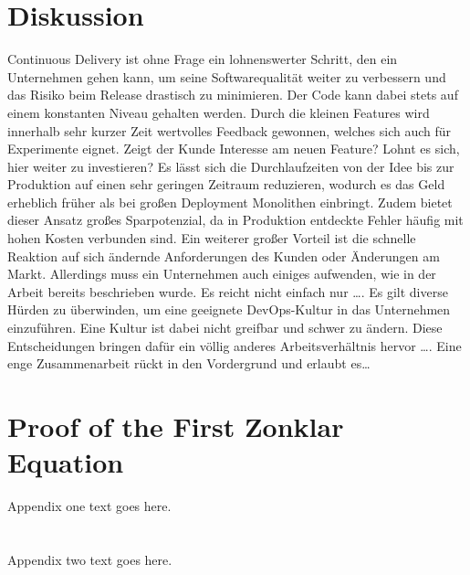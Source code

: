 \section{Diskussion}
Continuous Delivery ist ohne Frage ein lohnenswerter Schritt, den ein Unternehmen gehen kann, um seine Softwarequalität weiter zu verbessern und das Risiko beim Release drastisch zu minimieren. Der Code kann dabei stets auf einem konstanten Niveau gehalten werden. Durch die kleinen Features wird innerhalb sehr kurzer Zeit wertvolles Feedback gewonnen, welches sich auch für Experimente eignet. Zeigt der Kunde Interesse am neuen Feature? Lohnt es sich, hier weiter zu investieren? Es lässt sich die Durchlaufzeiten von der Idee bis zur Produktion auf einen sehr geringen Zeitraum reduzieren, wodurch es das Geld erheblich früher als bei großen Deployment Monolithen einbringt. Zudem bietet dieser Ansatz großes Sparpotenzial, da in Produktion entdeckte Fehler häufig mit hohen Kosten verbunden sind. Ein weiterer großer Vorteil ist die schnelle Reaktion auf sich ändernde Anforderungen des Kunden oder Änderungen am Markt. Allerdings muss ein Unternehmen auch einiges aufwenden, wie in der Arbeit bereits beschrieben wurde. 
Es reicht nicht einfach nur …. Es gilt diverse Hürden zu überwinden, um eine geeignete DevOps-Kultur in das Unternehmen einzuführen. Eine Kultur ist dabei nicht greifbar und schwer zu ändern. Diese Entscheidungen bringen dafür ein völlig anderes Arbeitsverhältnis hervor …. Eine enge Zusammenarbeit rückt in den Vordergrund und erlaubt es…



\appendices
\section{Proof of the First Zonklar Equation}
Appendix one text goes here.

\section{}
Appendix two text goes here.


\ifCLASSOPTIONcaptionsoff
  \newpage
\fi